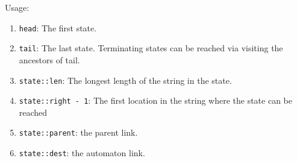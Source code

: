Usage:
\begin{enumerate}
\item \texttt{head}: The first state.
\item \texttt{tail}: The last state. Terminating states can be reached via visiting the ancestors of tail.
\item \texttt{state::len}: The longest length of the string in the state.
\item \texttt{state::right - 1}: The first location in the string where the state can be reached
\item \texttt{state::parent}: the parent link.
\item \texttt{state::dest}: the automaton link.
\end{enumerate}


